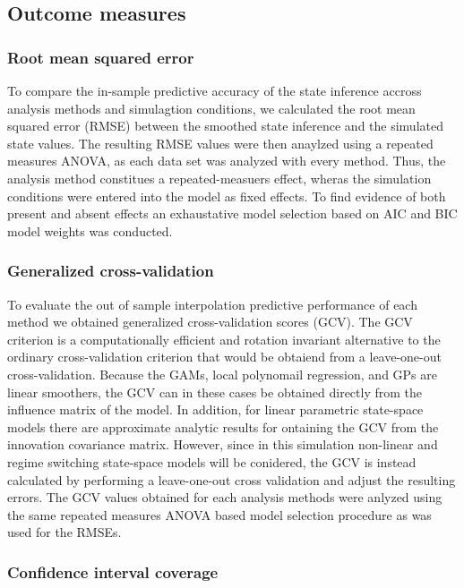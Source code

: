 \subsection{Outcome measures}

\subsubsection{Root mean squared error}

To compare the in-sample predictive accuracy of the state inference accross 
analysis methods and simulagtion conditions, we calculated the root mean 
squared error (RMSE) between the smoothed state inference and the simulated 
state values. The resulting RMSE values were then anaylzed using a repeated measures 
ANOVA, as each data set was analyzed with every method. Thus, the analysis 
method constitues a repeated-measuers effect, wheras the simulation conditions 
were entered into the model as fixed effects. To find evidence of both 
present and absent effects an exhaustative model selection based on AIC and BIC 
model weights was conducted. 

\subsubsection{Generalized cross-validation}

To evaluate the out of sample interpolation predictive performance of each method 
we obtained generalized cross-validation scores (GCV). The GCV 
criterion is a computationally efficient and rotation invariant alternative 
to the ordinary cross-validation criterion that would be obtaiend from a
leave-one-out cross-validation. Because the GAMs, local polynomail regression, 
and GPs are linear smoothers, the GCV can in these cases be obtained directly 
from the influence matrix of the model. In addition, for linear parametric state-space models 
there are approximate analytic results for ontaining the GCV from the innovation 
covariance matrix. However, since in this simulation non-linear and regime 
switching state-space models will be conidered, the GCV is instead calculated 
by performing a leave-one-out cross validation and adjust the resulting errors. 
The GCV values obtained for each analysis methods were anlyzed using the same 
repeated measures ANOVA based model selection procedure as was used for the RMSEs. 

\subsubsection{Confidence interval coverage}

